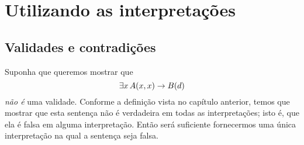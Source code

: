 \chapter{Utilizando as interpretações}
\label{sec.UsingModels}

\section{Validades e contradições}
Suponha que queremos mostrar que
$$\exists x\, \mathord{A}(x,x) \rightarrow \mathord{B}(d)$$
\emph{não é} uma validade.
Conforme a definição vista no capítulo anterior, temos que mostrar que esta  sentença não é verdadeira em todas as interpretações; isto é, que ela é falsa em alguma interpretação.
Então será suficiente fornecermos uma única interpretação na qual a sentença seja falsa.

